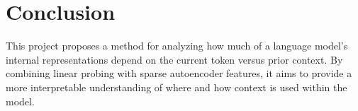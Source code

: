 \documentclass{article}
\begin{document}
\section{Conclusion}

This project proposes a method for analyzing how much of a language model's internal representations depend on the current token versus prior context. By combining linear probing with sparse autoencoder features, it aims to provide a more interpretable understanding of where and how context is used within the model.
\end{document}
